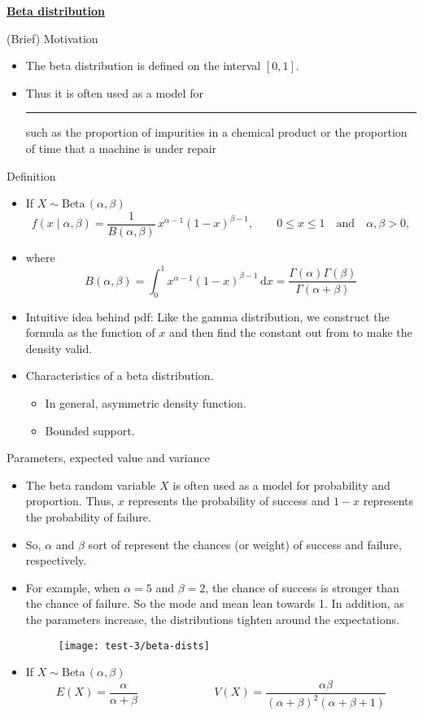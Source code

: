 \documentclass{article}
\newcommand{\bu}[1]{\textbf{\ul{#1}}}				%
\newcommand{\blankul}[1]{\rule[-1.5mm]{#1}{0.15mm}}	%
\newcommand{\follow}[1]{\sim \text{#1}\,}		%
\newcommand{\integral}[4]{\displaystyle \int_{#1}^{#2} #3 \,\mathrm{d} #4}		%
\newcommand{\gam}[1]{\Gamma(#1)}		%
\newcommand{\Beta}[2]{B(#1, #2)}		%
\begin{document}
\newpage

\bu{Beta distribution}\bigskip

(Brief) Motivation\bigskip
\begin{itemize}
    \item The beta distribution is defined on the interval $[0, 1]$. 
    \item Thus it is often used as a model for \blankul{4cm} such as the proportion of impurities in a chemical product or the proportion of time that a machine is under repair
\end{itemize}\bigskip

Definition\bigskip
\begin{itemize}
    \item If $X \follow{Beta}(\alpha, \beta)$\bigskip
    \[f(x \mid \alpha, \beta) = \frac{1}{\Beta{\alpha}{\beta}} \, x^{\alpha-1} (1 - x)^{\beta-1}, \quad\quad  0  \le x \le 1 \quad \text{and}\quad \alpha, \beta > 0,\]
    \item[] where
    \[\Beta{\alpha}{\beta} = \integral{0}{1}{x^{\alpha-1} (1 - x)^{\beta-1}}{x} = \frac{\gam{\alpha}\gam{\beta}}{\gam{\alpha + \beta}}\]
    \item Intuitive idea behind pdf: Like the gamma distribution, we construct the formula as the function of $x$ and then find the constant out from to make the density valid.
    \item Characteristics of a beta distribution.
    \begin{itemize}
        \item In general, asymmetric density function.
        \item Bounded support.
    \end{itemize}
\end{itemize}\bigskip

Parameters, expected value and variance\bigskip
\begin{itemize}
    \item The beta random variable $X$ is often used as a model for probability and proportion. Thus, $x$ represents the probability of success and $1 - x$ represents the probability of failure.
    \item[] So, $\alpha$ and $\beta$ sort of represent the chances (or weight) of success and failure, respectively.
    \item For example, when $\alpha = 5$ and $\beta = 2$, the chance of success is stronger than the chance of failure. So the mode and mean lean towards 1. In addition, as the parameters increase, the distributions tighten around the expectations.\bigskip
    \begin{figure}[H]
        \center\texttt{[image: test-3/beta-dists]}
    \end{figure}
    \item If $X \follow{Beta}(\alpha, \beta)$
    \[E(X) = \frac{\alpha}{\alpha + \beta} \hspace{80pt} V(X) = \frac{\alpha \beta}{(\alpha + \beta)^2 (\alpha + \beta + 1)}\]
\end{itemize}
\end{document}
